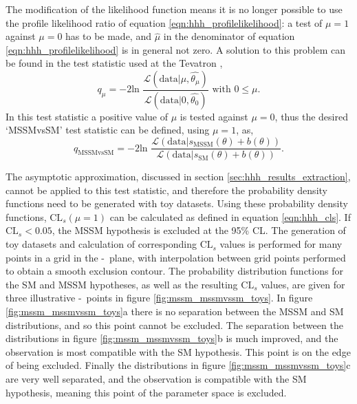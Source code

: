 The modification of the likelihood function means it is no longer possible
to use the profile likelihood ratio of equation \ref{eqn:hhh_profilelikelihood}:
a test of $\mu=1$ against $\mu=0$ has to be made, and 
$\hat{\mu}$ in the denominator of equation \ref{eqn:hhh_profilelikelihood} is in 
general not zero. A solution to this problem can be found in the test statistic used at the Tevatron \cite{LHCHComb2011,TEV-Higgs},
\begin{equation}\label{eqn:mssm_tevatron_teststat}
q_{\mu} = -2\text{ln }\frac{\mathcal{L}(\text{data}|\mu,\hat{\theta_{\mu}})}{\mathcal{L}(\text{data}|0,\hat{\theta_0})} \text{ with } 0\leq\mu.
\end{equation}
In this test statistic a positive value of $\mu$ is tested against $\mu=0$, thus 
the desired `MSSMvsSM' test statistic can be defined, using $\mu=1$, as,
\begin{equation}\label{eqn:mssm_mssmvssm_stat}
q_{\text{MSSMvsSM}} = -2\text{ln }\frac{\mathcal{L}(\text{data}|s_{\text{MSSM}}(\theta) + b(\theta))}{\mathcal{L}(\text{data}|s_{\text{SM}}(\theta)+b(\theta))}.
\end{equation}

The asymptotic approximation, discussed in section \ref{sec:hhh_results_extraction}, cannot be applied
to this test statistic, and therefore the probability density functions need to be generated 
with toy datasets. Using these probability density functions, $\text{CL}_s(\mu=1)$ can be calculated as defined in equation \ref{eqn:hhh_cls}.
If $\text{CL}_s < 0.05$, the \ac{MSSM} hypothesis is excluded at the 95\% CL. The generation of toy datasets and 
calculation of corresponding $\text{CL}_s$ values is performed for many points in a grid in the \mA-\tanb~plane,
with interpolation between grid points performed to obtain a smooth exclusion contour.
The probability distribution functions for the \ac{SM} and \ac{MSSM} hypotheses, as well as the resulting $\text{CL}_s$ values,
are given for three illustrative \mA-\tanb~points in figure \ref{fig:mssm_mssmvssm_toys}. In figure \ref{fig:mssm_mssmvssm_toys}a
there is no separation between the \ac{MSSM} and \ac{SM} distributions, and so this point cannot be excluded. The separation
between the distributions in figure \ref{fig:mssm_mssmvssm_toys}b is much improved, and the observation is most compatible
with the \ac{SM} hypothesis. This point is on the edge of being excluded. Finally the distributions in figure \ref{fig:mssm_mssmvssm_toys}c
are very well separated, and the observation is compatible with the \ac{SM} hypothesis, meaning this point of the parameter space is excluded.
\clearpage


